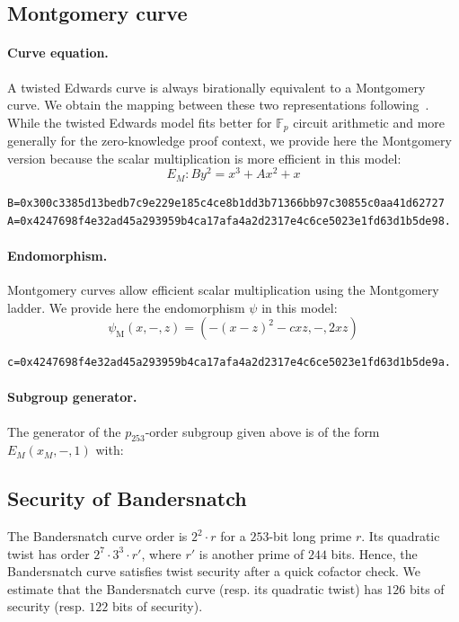 \documentclass{article}
\theoremstyle{definition}
\begin{document}
\subsection{Montgomery curve}
\paragraph{Curve equation.}
A twisted Edwards curve is always birationally equivalent to a
Montgomery curve. We obtain the mapping between these two
representations following~\cite{JCEng:CosSmi18}.
While the twisted Edwards model fits better for $\mathbb F_p$ circuit
arithmetic and more generally for the zero-knowledge proof context, we
provide here the Montgomery version because the scalar multiplication
is more efficient in this model:
$$E_M: By^2 = x^3 + Ax^2 + x$$
\begin{verbatim}
B=0x300c3385d13bedb7c9e229e185c4ce8b1dd3b71366bb97c30855c0aa41d62727
A=0x4247698f4e32ad45a293959b4ca17afa4a2d2317e4c6ce5023e1fd63d1b5de98.
\end{verbatim}

\paragraph{Endomorphism.}
Montgomery curves allow efficient scalar multiplication using the
Montgomery ladder. We provide here the endomorphism $\psi$ in this
model:
$$\psi_\text{M}(x,-,z) = (-(x-z)^2 - cxz, -, 2xz)$$
\begin{verbatim}
c=0x4247698f4e32ad45a293959b4ca17afa4a2d2317e4c6ce5023e1fd63d1b5de9a.
\end{verbatim}

\paragraph{Subgroup generator.}
The generator of the $p_{253}$-order subgroup given above is of the
form $E_M(x_M,-,1)$ with:


\subsection{Security of Bandersnatch}

The Bandersnatch curve order is $2^2\cdot r$ for a $253$-bit long
prime $r$.
Its quadratic twist has order
$2^7 \cdot 3^3 \cdot r'$, where $r'$ is another prime of $244$ bits.
Hence, the Bandersnatch curve satisfies twist security after a quick cofactor
check.
We estimate that the Bandersnatch curve (resp. its quadratic twist)
has $126$ bits of security (resp. $122$ bits of security).
\end{document}
